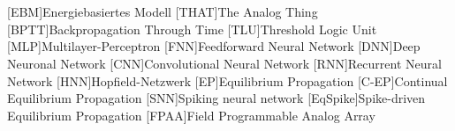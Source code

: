 \section*{}

\begin{acronym}[WYSIWYG]\itemsep0pt
  [EBM]{Energiebasiertes Modell}
  [THAT]{The Analog Thing}
  [BPTT]{Backpropagation Through Time}
  [TLU]{Threshold Logic Unit}
  [MLP]{Multilayer-Perceptron}
  [FNN]{Feedforward Neural Network}
  [DNN]{Deep Neuronal Network}
  [CNN]{Convolutional Neural Network}
  [RNN]{Recurrent Neural Network}
  [HNN]{Hopfield-Netzwerk}
  [EP]{Equilibrium Propagation}
  [C-EP]{Continual Equilibrium Propagation}
  [SNN]{Spiking neural network}
  [EqSpike]{Spike-driven Equilibrium Propagation}
  [FPAA]{Field Programmable Analog Array}
\end{acronym}
